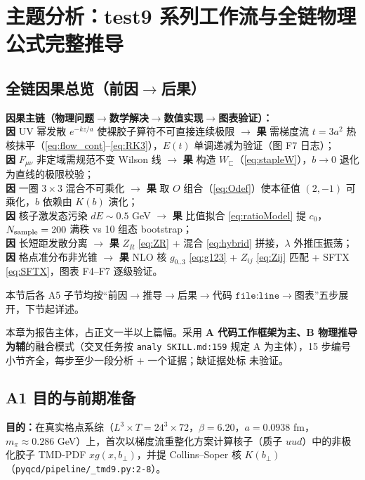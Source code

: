 \documentclass[UTF8]{ctexart}
\begin{document}
\section{主题分析：test9 系列工作流与全链物理公式完整推导}
\label{sec:topic}

\subsection{全链因果总览（前因$\rightarrow$后果）}
\label{sec:causal}
\begin{keybox}
\textbf{因果主链（物理问题$\rightarrow$数学解决$\rightarrow$数值实现$\rightarrow$图表验证）：}\\
\textbf{因} UV 幂发散 $e^{-kz/a}$ 使裸胶子算符不可直接连续极限 $\rightarrow$ \textbf{果} 需梯度流 $t=3a^2$ 热核抹平（\eqref{eq:flow_cont}--\eqref{eq:RK3}），$E(t)$ 单调递减为验证（图 F7 日志）；\\
\textbf{因} $F_{\mu\nu}$ 非定域需规范不变 Wilson 线 $\rightarrow$ \textbf{果} 构造 $W_\sqsubset$（\eqref{eq:stapleW}），$b\to0$ 退化为直线的极限校验；\\
\textbf{因} 一圈 $3\times3$ 混合不可乘化 $\rightarrow$ \textbf{果} 取 $O$ 组合（\eqref{eq:Odef}）使本征值 $(2,-1)$ 可乘化，$b$ 依赖由 $K(b)$ 演化；\\
\textbf{因} 核子激发态污染 $dE\sim0.5$ GeV $\rightarrow$ \textbf{果} 比值拟合 \eqref{eq:ratioModel} 提 $c_0$，$N_{\rm sample}=200$ 满秩 vs 10 组态 bootstrap；\\
\textbf{因} 长短距发散分离 $\rightarrow$ \textbf{果} $Z_R$ \eqref{eq:ZR} + 混合 \eqref{eq:hybrid} 拼接，$\lambda$ 外推压振荡；\\
\textbf{因} 格点准分布非光锥 $\rightarrow$ \textbf{果} NLO 核 $g_{0..3}$ \eqref{eq:g123} + $Z_{ij}$ \eqref{eq:Zij} 匹配 + SFTX \eqref{eq:SFTX}，图表 F4--F7 逐级验证。
\end{keybox}
本节后各 A5 子节均按“前因$\rightarrow$推导$\rightarrow$后果$\rightarrow$代码 $\texttt{file:line}$$\rightarrow$图表”五步展开，下节起详述。

本章为报告主体，占正文一半以上篇幅。采用 \textbf{A 代码工作框架为主、B 物理推导为辅}的融合模式（交叉任务按 \texttt{\nolinkurl{analy SKILL.md:159}} 规定 A 为主体），15 步编号小节齐全，每步至少一段分析 $+$ 一个证据；缺证据处标 \textcolor{warn}{未验证}。

\subsection{A1 目的与前期准备}
\textbf{目的：}在真实格点系综（$L^3\times T=24^3\times72$，$\beta=6.20$，$a=0.0938$ fm，$m_\pi\approx0.286$ GeV）上，首次以梯度流重整化方案计算核子（质子 $uud$）中的非极化胶子 TMD-PDF $xg(x,b_\perp)$，并提 Collins--Soper 核 $K(b_\perp)$（\texttt{\nolinkurl{pyqcd/pipeline/\_tmd9.py:2-8}}）。
\end{document}
